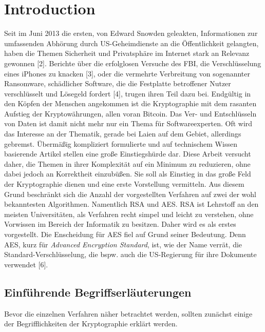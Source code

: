 \documentclass[conference,10pt,a4paper,twocolumn]{IEEEtran}
\begin{document}
\section{Introduction}
Seit im Juni 2013 die ersten, von Edward Snowden geleakten, Informationen zur umfassenden Abhörung durch US-Geheimdienste an die Öffentlichkeit gelangten, haben die Themen Sicherheit und Privatsphäre im Internet stark an Relevanz gewonnen [2]. Berichte über die erfolglosen Versuche des FBI, die Verschlüsselung eines iPhones zu knacken [3], oder die vermehrte Verbreitung von sogenannter Ransomware, schädlicher Software, die die Festplatte betroffener Nutzer verschlüsselt und Lösegeld fordert [4], trugen ihren Teil dazu bei. Endgültig in den Köpfen der Menschen angekommen ist die Kryptographie mit dem rasanten Aufstieg der Kryptowährungen, allen voran Bitcoin. Das Ver- und Entschlüsseln von Daten ist damit nicht mehr nur ein Thema für Softwareexperten. Oft wird das Interesse an der Thematik, gerade bei Laien auf dem Gebiet, allerdings gebremst. Übermäßig kompliziert formulierte und auf technischem Wissen basierende Artikel stellen eine große Einstiegshürde dar. Diese Arbeit versucht daher, die Themen in ihrer Komplexität auf ein Minimum zu reduzieren, ohne dabei jedoch an Korrektheit einzubüßen. Sie soll als Einstieg in das große Feld der Kryptographie dienen und eine erste Vorstellung vermitteln. Aus diesem Grund beschränkt sich die Anzahl der vorgestellten Verfahren auf zwei der wohl bekanntesten Algorithmen. Namentlich RSA und AES. RSA ist Lehrstoff an den meisten Universitäten, als Verfahren recht simpel und leicht zu verstehen, ohne Vorwissen im Bereich der Informatik zu besitzen. Daher wird es als erstes vorgestellt. Die Enscheidung für AES fiel auf Grund seiner Bedeutung. Denn AES, kurz für \emph{Advanced Encryption Standard}, ist, wie der Name verrät, die Standard-Verschlüsselung, die bspw. auch die US-Regierung für ihre Dokumente verwendet [6].

 
\subsection{Einführende Begriffserläuterungen}
Bevor die einzelnen Verfahren näher betrachtet werden, sollten zunächst einige der Begrifflichkeiten der Kryptographie erklärt werden.

\bigskip
\end{document}
